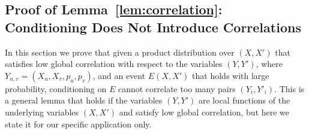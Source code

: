\documentclass[11pt]{article}
\DeclareMathOperator*{\E}{\mathbb{E}}
\DeclareMathOperator*{\pE}{\widetilde{\mathbb{E}}}
\DeclareMathOperator*{\pPr}{\widetilde{\Pr}}
\def \cL {\mathcal{L}}
\theoremstyle{definition}
\begin{document}



\subsection{Proof of Lemma~\ref{lem:correlation}: 
Conditioning Does Not Introduce Correlations}

In this section we prove that given a product distribution over $(X,X')$ that satisfies low global correlation with respect to the variables $(Y,Y')$, where $Y_{u,v} = (X_u,X_v,p_u,p_v)$, and an event $E(X,X')$ that holds with large probability, conditioning on $E$ cannot correlate too many pairs $(Y_i,Y'_i)$. This is a general lemma that holds if the variables $(Y,Y')$ are local functions of the underlying variables $(X,X')$ and satisfy low global correlation, but here we state it for our specific application only. 
\end{document}

